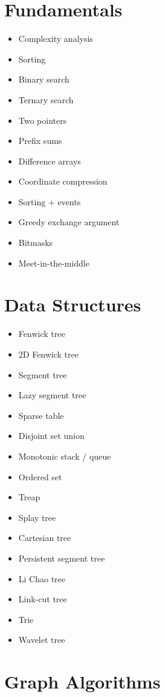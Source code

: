 \section*{Fundamentals}

\begin{itemize}
  \item Complexity analysis
  \item Sorting
  \item Binary search
  \item Ternary search
  \item Two pointers
  \item Prefix sums
  \item Difference arrays
  \item Coordinate compression
  \item Sorting + events
  \item Greedy exchange argument
  \item Bitmasks
  \item Meet-in-the-middle
\end{itemize}

\section*{Data Structures}

\begin{itemize}
  \item Fenwick tree
  \item 2D Fenwick tree
  \item Segment tree
  \item Lazy segment tree
  \item Sparse table
  \item Disjoint set union
  \item Monotonic stack / queue
  \item Ordered set
  \item Treap
  \item Splay tree
  \item Cartesian tree
  \item Persistent segment tree
  \item Li Chao tree
  \item Link-cut tree
  \item Trie
  \item Wavelet tree
\end{itemize}

\section*{Graph Algorithms}

